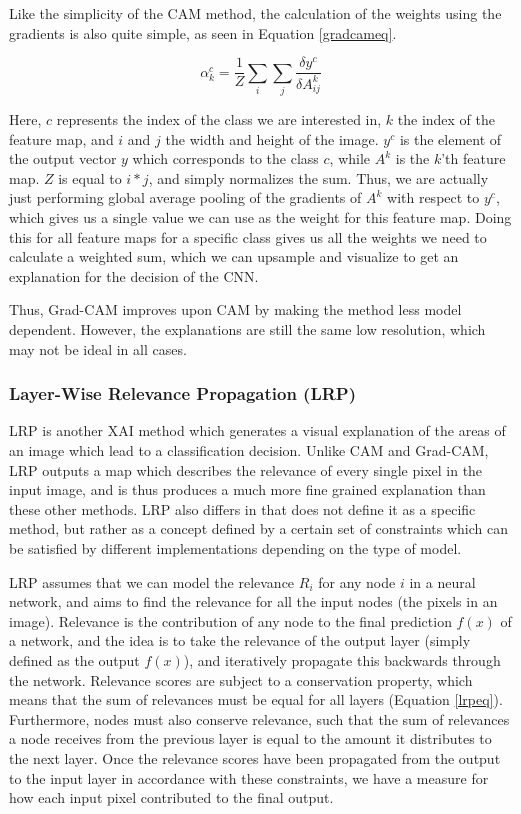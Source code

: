 \documentclass[UKenglish]{uiomasterthesis} %
\theoremstyle{definition}
\begin{document}
Like the simplicity of the CAM method, the calculation of the weights using the gradients is also quite simple, as seen in Equation \ref{gradcameq}.

\begin{equation}
\alpha^c_k = \frac{1}{Z} \sum_i \sum_j \frac{\delta y^c}{\delta A^k_{ij}}
\label{gradcameq}
\end{equation}

Here, $c$ represents the index of the class we are interested in, $k$ the index of the feature map, and $i$ and $j$ the width and height of the image. $y^c$ is the element of the output vector $y$ which corresponds to the class $c$, while $A^k$ is the $k$'th feature map. $Z$ is equal to $i * j$, and simply normalizes the sum. Thus, we are actually just performing global average pooling of the gradients of $A^k$ with respect to $y^c$, which gives us a single value we can use as the weight for this feature map. Doing this for all feature maps for a specific class gives us all the weights we need to calculate a weighted sum, which we can upsample and visualize to get an explanation for the decision of the CNN.

Thus, Grad-CAM improves upon CAM by making the method less model dependent. However, the explanations are still the same low resolution, which may not be ideal in all cases.
\\


\subsubsection{Layer-Wise Relevance Propagation (LRP)}

LRP is another XAI method which generates a visual explanation of the areas of an image which lead to a classification decision. Unlike CAM and Grad-CAM, LRP outputs a map which describes the relevance of every single pixel in the input image, and is thus produces a much more fine grained explanation than these other methods. LRP also differs in that \cite{lrp} does not define it as a specific method, but rather as a concept defined by a certain set of constraints which can be satisfied by different implementations depending on the type of model.

LRP assumes that we can model the relevance $R_i$ for any node $i$ in a neural network, and aims to find the relevance for all the input nodes (the pixels in an image). Relevance is the contribution of any node to the final prediction $f(x)$ of a network, and the idea is to take the relevance of the output layer (simply defined as the output $f(x)$), and iteratively propagate this backwards through the network. Relevance scores are subject to a conservation property, which means that the sum of relevances must be equal for all layers (Equation \ref{lrpeq}). Furthermore, nodes must also conserve relevance, such that the sum of relevances a node receives from the previous layer is equal to the amount it distributes to the next layer. Once the relevance scores have been propagated from the output to the input layer in accordance with these constraints, we have a measure for how each input pixel contributed to the final output.
\end{document}
